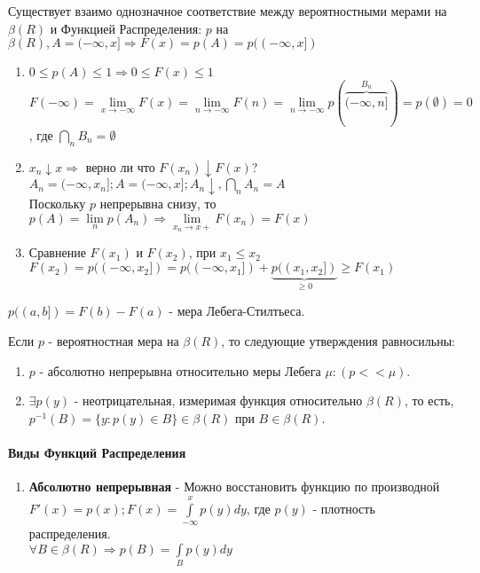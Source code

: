 Существует взаимо однозначное соответствие между вероятностными мерами на $\beta (R)$ и Функцией Распределения: $p$ на $\beta (R), A = (-\infty, x] \Rightarrow F(x) = p(A) = p((-\infty, x])$
\begin{enumerate}
 \item $0 \leqslant p(A) \leqslant 1 \Rightarrow 0 \leqslant F(x) \leqslant 1$\\
  $F(-\infty) = \lim\limits_{x \rightarrow -\infty} F(x) = \lim\limits_{n \rightarrow -\infty} F(n) = \lim\limits_{n \rightarrow -\infty} p(\overbrace{(-\infty, n]}^{B_n}) = p(\emptyset) = 0$, где $\bigcap\limits_n B_n = \emptyset$
 \item $x_n \downarrow x \Rightarrow$ верно ли что $F(x_n) \downarrow F(x)$?\\
  $A_n = (-\infty, x_n]; A = (-\infty, x]; A_n \downarrow, \bigcap\limits_{n} A_n = A$\\
  Поскольку $p$ непрерывна снизу, то $p(A) = \lim\limits_{n} p(A_n) \Rightarrow \lim\limits_{x_n \rightarrow x+} F(x_n) = F(x)$
 \item Сравнение $F(x_1)$ и $F(x_2)$, при $x_1 \leq x_2$\\
  $F(x_2) = p((-\infty, x_2]) = p((-\infty, x_1]) + \underbrace{p((x_1, x_2])}_{\geqslant 0} \geqslant F(x_1)$
\end{enumerate}
\begin{definition}
 $p((a, b]) = F(b) - F(a)$ - мера Лебега-Стилтьеса.
\end{definition}
\begin{theorem}
 Если $p$ - вероятностная мера на $\beta (R)$, то следующие утверждения равносильны:
 \begin{enumerate}
  \item $p$ - абсолютно непрерывна относительно меры Лебега $\mu: (p << \mu)$.
  \item $\exists p(y)$ - неотрицательная, измеримая функция относительно $\beta (R)$, то есть, $p^{-1}(B) = \lbrace y: p(y) \in B \rbrace \in \beta (R)$ при $B \in \beta (R)$.
 \end{enumerate}
\end{theorem}

\paragraph{Виды Функций Распределения}
\begin{enumerate}
 \item \textbf{Абсолютно непрерывная} - Можно восстановить функцию по производной\\
  $F'(x) = p(x); F(x) = \int\limits_{-\infty}^{x} p(y)dy$, где $p(y)$ - плотность распределения.\\
  $\forall B \in \beta (R) \Rightarrow p(B) = \int\limits_B p(y)dy$
\end{enumerate}

